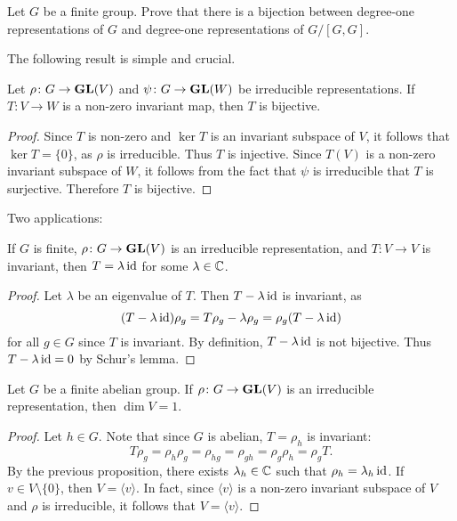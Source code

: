 \begin{exercise}
Let $G$ be a finite group.
Prove that there is a bijection between degree-one representations of $G$ and
degree-one representations of $G/[G,G]$.
\end{exercise}

The following result is simple and crucial. 

\begin{lemma}[Schur]
    Let $\rho\colon G\to\mathbf{GL}(V)$ and $\psi\colon G\to\mathbf{GL}(W)$ be irreducible representations. If 
    $T\colon V\to W$ is a non-zero invariant map, then $T$ is bijective.  
\end{lemma}

\begin{proof}
    Since $T$ is non-zero and $\ker T$ is an invariant subspace of $V$, it follows that $\ker T=\{0\}$, as $\rho$ is irreducible. Thus 
    $T$ is injective. Since $T(V)$ is a non-zero invariant subspace of $W$, it follows from the fact that $\psi$ is irreducible 
    that $T$ is surjective. Therefore $T$ 
    is bijective.  
\end{proof}

Two applications:

\begin{proposition}
    If $G$ is finite, $\rho\colon G\to\mathbf{GL}(V)$ is an irreducible representation, and $T\colon V\to V$ is invariant, then 
    $T=\lambda\operatorname{id}$ for some $\lambda\in\mathbb{C}$. 
\end{proposition}

\begin{proof}
    Let $\lambda$ be an eigenvalue of $T$. Then $T-\lambda\operatorname{id}$ is invariant, as 
    \[
    (T-\lambda\operatorname{id})\rho_g=T\rho_g-\lambda\rho_g=\rho_g(T-\lambda\operatorname{id})
    \]
    for all $g\in G$ since $T$ is invariant. By definition, 
    $T-\lambda\operatorname{id}$ is not bijective. Thus $T-\lambda\operatorname{id}=0$ by Schur's lemma.
\end{proof}

\begin{proposition}
    Let $G$ be a finite abelian group. 
    If $\rho\colon G\to\mathbf{GL}(V)$ is an irreducible representation, then
    $\dim V=1$. 
\end{proposition}

\begin{proof}
    Let $h\in G$. Note that since $G$ is abelian, $T=\rho_h$ is invariant:
    \[
    T\rho_g=\rho_h\rho_g=\rho_{hg}=\rho_{gh}=\rho_g\rho_h=\rho_gT.
    \]
    By the previous proposition, 
    there exists $\lambda_h\in\mathbb{C}$ such that $\rho_h=\lambda_h\operatorname{id}$. If $v\in V\setminus\{0\}$, 
    then $V=\langle v\rangle$. In fact, since 
    $\langle v\rangle$ is a non-zero invariant subspace of $V$ and $\rho$ is irreducible, 
    it follows that $V=\langle v\rangle$. 
\end{proof}

